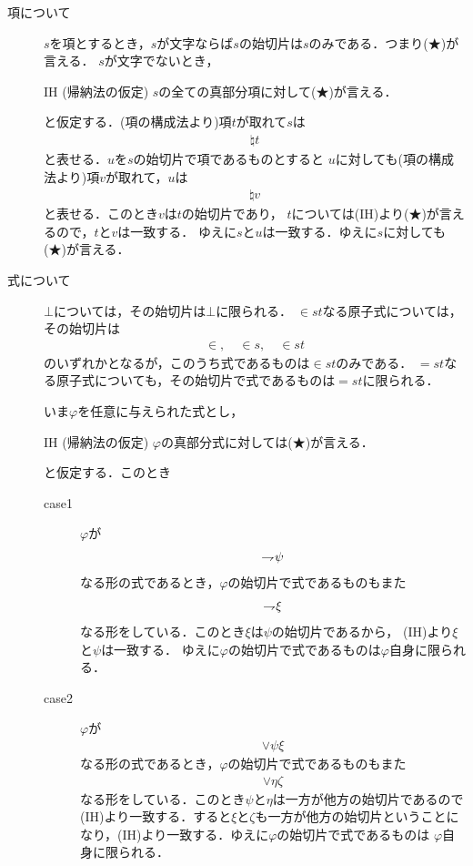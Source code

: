 	\begin{metaprf}\mbox{}
		\begin{description}
			\item[項について]
				$s$を項とするとき，$s$が文字ならば$s$の始切片は$s$のみである．つまり(★)が言える．
				$s$が文字でないとき，
				\begin{itembox}[l]{IH (帰納法の仮定)}
					$s$の全ての真部分項に対して(★)が言える．
				\end{itembox}
				と仮定する．(項の構成法より)項$t$が取れて$s$は
				\begin{align}
					\natural t
				\end{align}
				と表せる．$u$を$s$の始切片で項であるものとすると
				$u$に対しても(項の構成法より)項$v$が取れて，$u$は
				\begin{align}
					\natural v
				\end{align}
				と表せる．このとき$v$は$t$の始切片であり，
				$t$については(IH)より(★)が言えるので，$t$と$v$は一致する．
				ゆえに$s$と$u$は一致する．ゆえに$s$に対しても(★)が言える．
				
			\item[式について]
				$\bot$については，その始切片は$\bot$に限られる．
				$\in st$なる原子式については，その始切片は
				\begin{align}
					\in, \quad \in s, \quad \in st
				\end{align}
				のいずれかとなるが，このうち式であるものは$\in st$のみである．
				$=st$なる原子式についても，その始切片で式であるものは$=st$に限られる．
	
				いま$\varphi$を任意に与えられた式とし，
				\begin{itembox}[l]{IH (帰納法の仮定)}
					$\varphi$の真部分式に対しては(★)が言える．
				\end{itembox}
				と仮定する．このとき
				\begin{description}
					\item[case1] $\varphi$が
						\begin{align}
							\rightharpoondown\hspace{-0.25em} \psi
						\end{align}
						なる形の式であるとき，$\varphi$の始切片で式であるものもまた
						\begin{align}
							\rightharpoondown\hspace{-0.25em} \xi
						\end{align}
						なる形をしている．このとき$\xi$は$\psi$の始切片であるから，
						(IH)より$\xi$と$\psi$は一致する．
						ゆえに$\varphi$の始切片で式であるものは$\varphi$自身に限られる．
			
					\item[case2] $\varphi$が
						\begin{align}
							\vee \psi \xi
						\end{align}
						なる形の式であるとき，$\varphi$の始切片で式であるものもまた
						\begin{align}
							\vee \eta \zeta
						\end{align}
						なる形をしている．このとき$\psi$と$\eta$は一方が他方の始切片であるので
						(IH)より一致する．すると$\xi$と$\zeta$も一方が他方の始切片ということに
						なり，(IH)より一致する．ゆえに$\varphi$の始切片で式であるものは
						$\varphi$自身に限られる．
						

\end{description}
\end{description}
\end{metaprf}
